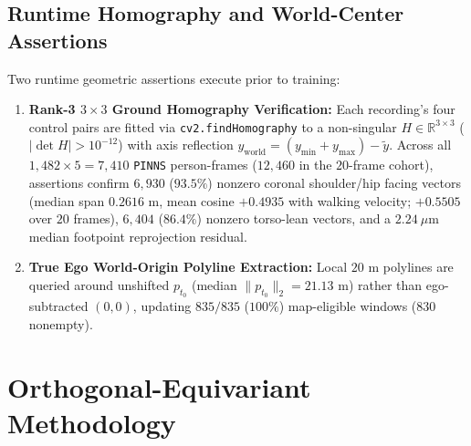 \documentclass[journal]{IEEEtran}
\begin{document}
\subsection{Runtime Homography and World-Center Assertions}
Two runtime geometric assertions execute prior to training:
\begin{enumerate}
  \item \textbf{Rank-3 $3\times 3$ Ground Homography Verification:} Each recording's four control pairs are fitted via \texttt{cv2.findHomography} to a non-singular $H \in \mathbb{R}^{3\times 3}$ ($|\det H| > 10^{-12}$) with axis reflection $y_{\text{world}} = (y_{\min} + y_{\max}) - \tilde{y}$. Across all $1{,}482 \times 5 = 7{,}410$ \texttt{PINNS} person-frames ($12{,}460$ in the $20$-frame cohort), assertions confirm $6{,}930$ ($93.5\%$) nonzero coronal shoulder/hip facing vectors (median span $0.2616\text{ m}$, mean cosine $+0.4935$ with walking velocity; $+0.5505$ over $20$ frames), $6{,}404$ ($86.4\%$) nonzero torso-lean vectors, and a $2.24\ \mu\text{m}$ median footpoint reprojection residual.
  \item \textbf{True Ego World-Origin Polyline Extraction:} Local $20\text{ m}$ polylines are queried around unshifted $p_{t_0}$ (median $\|p_{t_0}\|_2 = 21.13\text{ m}$) rather than ego-subtracted $(0, 0)$, updating $835 / 835$ ($100\%$) map-eligible windows ($830$ nonempty).
\end{enumerate}

\section{Orthogonal-Equivariant Methodology}
\end{document}
